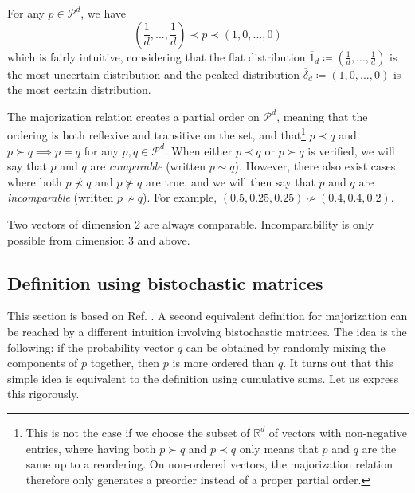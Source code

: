 \begin{remark}
    For any $p \in \mathcal{P}^d$, we have
    \begin{equation} \label{eq:top_bottom}
        \left(\frac{1}{d}, ..., \frac{1}{d}\right) \prec p \prec (1, 0, ..., 0)
    \end{equation}
    which is fairly intuitive, considering that the flat distribution $\overline{1}_d \coloneqq \left(\frac{1}{d}, ..., \frac{1}{d}\right)$ is the most uncertain distribution and the peaked distribution $\overline{\delta}_d \coloneqq (1, 0, ..., 0)$ is the most certain distribution. %
\end{remark}

The majorization relation creates a partial order on $\mathcal{P}^d$, meaning that the ordering is both reflexive and transitive on the set, and that\footnote{This is not the case if we choose the subset of $\mathbb{R}^d$  of vectors with non-negative entries, where having both $p \succ q$ and $p \prec q$ only means that $p$ and $q$ are the same up to a reordering. On non-ordered vectors, the majorization relation therefore only generates a preorder instead of a proper partial order.} $p \prec q$ and $p \succ q \implies p = q$ for any $p, q \in \mathcal{P}^d$. When either $p \prec q$ or $p \succ q$ is verified, we will say that $p$ and $q$ are \textit{comparable} (written $p \sim q$). However, there also exist cases where both $p \nprec q$ and $p \nsucc q$ are true, and we will then say that $p$ and $q$ are \textit{incomparable} (written $p \nsim q$). For example, $(0.5, 0.25, 0.25) \nsim (0.4, 0.4, 0.2)$.

\begin{remark}
    Two vectors of dimension 2 are always comparable. Incomparability is only possible from dimension 3 and above.
\end{remark}



\subsection{Definition using bistochastic matrices} \label{sec:bistochastic}

This section is based on Ref. \cite[pp. 29--33]{marshall_inequalities_2011}. A second equivalent definition for majorization can be reached by a different intuition involving bistochastic matrices. The idea is the following: if the probability vector $q$ can be obtained by randomly mixing the components of $p$ together, then $p$ is more ordered than $q$. It turns out that this simple idea is equivalent to the definition using cumulative sums. Let us express this rigorously.

